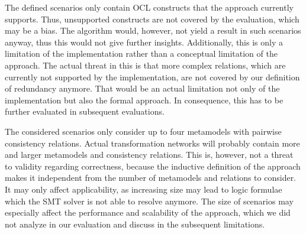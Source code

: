 The defined scenarios only contain \gls{OCL} constructs that the approach currently supports.
Thus, unsupported constructs are not covered by the evaluation, which may be a bias.
The algorithm would, however, not yield a result in such scenarios anyway, thus this would not give further insights.
Additionally, this is only a limitation of the implementation rather than a conceptual limitation of the approach.
The actual threat in this is that more complex relations, which are currently not supported by the implementation, are not covered by our definition of redundancy anymore.
That would be an actual limitation not only of the implementation but also the formal approach.
In consequence, this has to be further evaluated in subsequent evaluations.

The considered scenarios only consider up to four metamodels with pairwise consistency relations.
Actual transformation networks will probably contain more and larger metamodels and consistency relations.
This is, however, not a threat to validity regarding correctness, because the inductive definition of the approach makes it independent from the number of metamodels and relations to consider.
It may only affect applicability, as increasing size may lead to logic formulae which the \gls{SMT} solver is not able to resolve anymore.
The size of scenarios may especially affect the performance and scalability of the approach, which we did not analyze in our evaluation and discuss in the subsequent limitations.



